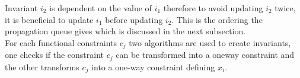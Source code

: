 Invariant $i_2$ is dependent on the value of $i_1$ therefore to avoid updating $i_2$ twice, it is beneficial to update 
$i_1$ before updating $i_2$. This is the ordering the propagation queue gives which is discussed in the next 
subsection. \medskip \\ 
For each functional constraints $c_j$ two algorithms are used to create invariants, one checks if the constraint $c_j$ 
can be transformed into a oneway constraint and the other transforms $c_j$ into a one-way constraint defining $x_i$.  \\



